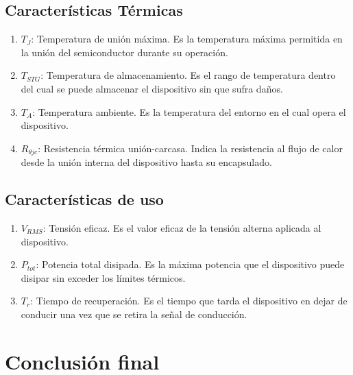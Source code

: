 \documentclass[chaptersright]{informeutn}
\begin{document}
  \section*{Características Térmicas}
  
    \begin{enumerate}
        \item $T_J$: Temperatura de unión máxima. Es la temperatura máxima permitida en la unión del semiconductor durante su operación.
        \item $T_{STG}$: Temperatura de almacenamiento. Es el rango de temperatura dentro del cual se puede almacenar el dispositivo sin que sufra daños.
        \item $T_A$: Temperatura ambiente. Es la temperatura del entorno en el cual opera el dispositivo.
        \item $R_{\theta jc}$: Resistencia térmica unión-carcasa. Indica la resistencia al flujo de calor desde la unión interna del dispositivo hasta su encapsulado.
    \end{enumerate}
  
  \section*{Características de uso}
  
    \begin{enumerate}
        \item $V_{RMS}$: Tensión eficaz. Es el valor eficaz de la tensión alterna aplicada al dispositivo.
        \item $P_{tot}$: Potencia total disipada. Es la máxima potencia que el dispositivo puede disipar sin exceder los límites térmicos.
        \item $T_r$: Tiempo de recuperación. Es el tiempo que tarda el dispositivo en dejar de conducir una vez que se retira la señal de conducción.
    \end{enumerate}

\chapter{Conclusión final}
\end{document}
